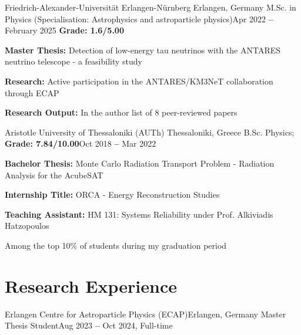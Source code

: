 \documentclass[letterpaper,11pt]{article}
\begin{document}
    \resumeEducationHeading
      {Friedrich-Alexander-Universität Erlangen-Nürnberg
      }{Erlangen, Germany}
      {M.Sc. in Physics (Specialisation: Astrophysics and astroparticle physics)}{Apr 2022 \textbf{--} February 2025}
      {\textbf{Grade: 1.6/5.00}}{}
        \resumeSubHeadingListStart
        \small{\item{
             \textbf{Master Thesis:} Detection of low-energy tau neutrinos with the
                    ANTARES neutrino telescope - a feasibility study}}
        \small{\item{
             \textbf{Research:} Active participation in the ANTARES/KM3NeT collaboration through ECAP}}
        \small{\item{
             \textbf{Research Output:} In the author list of 8 peer-reviewed papers}}
        \resumeSubHeadingListEnd

    \resumeSubheading
    {Aristotle University of Thessaloniki (AUTh)
      }{Thessaloniki, Greece}
      {B.Sc. Physics;
      \textbf{Grade: 7.84/10.00}}{Oct 2018 \textbf{--} Mar 2022}
        \resumeSubHeadingListStart
        \small{\item{
             \textbf{Bachelor Thesis:} Monte Carlo Radiation Transport Problem - Radiation Analysis for the AcubeSAT}}
        \small{\item{
             \textbf{Internship Title:} ORCA - Energy Reconstruction Studies}}
        \small{\item{
             \textbf{Teaching Assistant:} HM 131: Systems Reliability under Prof. Alkiviadis Hatzopoulos}}
        \small{\item{
            Among the top 10\% of students during my graduation period}}  
        \resumeSubHeadingListEnd

      
  \resumeSubHeadingListEnd


\section{Research Experience}
  \vspace{3pt}
  \resumeSubHeadingListStart

    \resumeSubheading
      {Erlangen Centre for Astroparticle Physics (ECAP)}{Erlangen, Germany}
      {Master Thesis Student}{Aug 2023 \textbf{--} Oct 2024, Full-time}
        \resumeItemListStart
        \resumeItemListEnd
\end{document}
